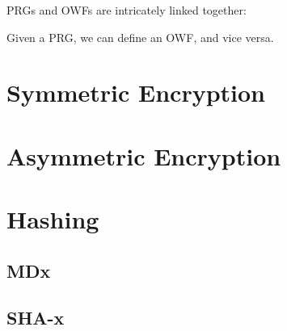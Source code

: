 PRGs and OWFs are intricately linked together:
\begin{theorem}
Given a PRG, we can define an OWF, and vice versa.
\end{theorem}

%

\section{Symmetric Encryption}\label{sec:sd:crypto:sym}


\section{Asymmetric Encryption}\label{sec:sd:crypto:asym}


\section{Hashing}\label{sec:sd:crypto:hash}

\subsection{MDx}

\subsection{SHA-x}

